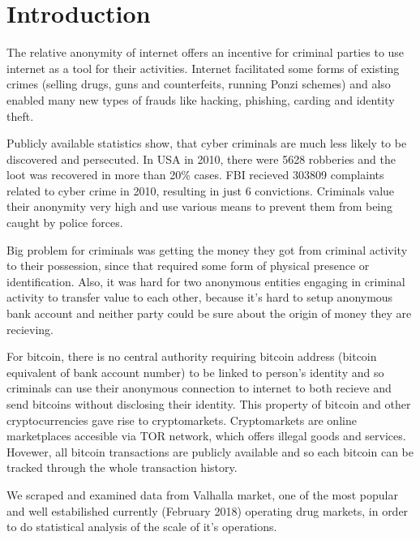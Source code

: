\documentclass[
  digital, %
  table,   %
  lof,     %
  lot,     %
  oneside
]{fithesis3}
\begin{document}
\chapter{Introduction}

The relative anonymity of internet offers an incentive for criminal parties to use internet as a tool for their activities.
Internet facilitated some forms of existing crimes (selling drugs, guns and
counterfeits, running Ponzi schemes) and also enabled many new types of frauds like hacking, phishing, carding and identity theft.

Publicly available statistics show, that cyber criminals are much
 less likely to be discovered and persecuted.
 In USA in 2010, there were 5628 robberies and the loot was recovered in more than 20\% cases. \parencite{fbi10}  %
 FBI recieved 303809 complaints related to cyber crime in 2010, resulting in just 6 convictions. \parencite{fbcyber}  %
Criminals value their anonymity very high and use various means to prevent them from being caught by police forces.

Big problem for criminals was getting the money they got from criminal activity to their possession,
since that required some form of physical presence or identification.
Also, it was hard for two anonymous entities engaging in criminal activity to transfer value to each other,
 because it's hard to setup anonymous bank account and neither party could be sure about the origin of
 money they are recieving.

For bitcoin, there is no central authority requiring bitcoin address
(bitcoin equivalent of bank account number) to be linked to person's identity and so 
criminals can use their anonymous connection to internet to both recieve and send bitcoins without disclosing their identity.
This property of bitcoin and other cryptocurrencies gave rise to cryptomarkets.
 Cryptomarkets are online marketplaces accesible via TOR network, which offers illegal goods and services.
Hovewer, all bitcoin transactions are publicly available and so each bitcoin can be tracked through the whole transaction history.

We scraped and examined data from Valhalla market,
 one of the most popular and well estabilished currently (February 2018) operating drug markets,
in order to do statistical analysis of the scale of it's operations.
\end{document}
